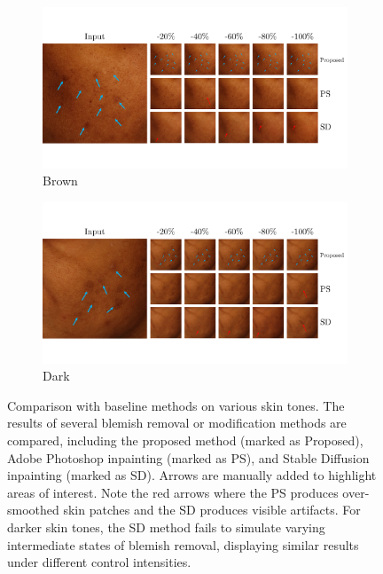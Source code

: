 \begin{spacing}{1.5}
\begin{figure}[t!]
\begin{subfigure}{\textwidth}
\begin{minipage}[c]{.85\textwidth}
        \end{minipage}
    \end{subfigure}
    \hfill
    \begin{subfigure}{\textwidth}
        \begin{minipage}[c]{.15\textwidth}
            \caption*{Brown}
        \end{minipage}%
        \begin{minipage}[c]{.85\textwidth}
            \includegraphics[width=\linewidth]{Chapter5/baseline/baseline43.pdf}
        \end{minipage}
    \end{subfigure}
    \hfill
    \begin{subfigure}{\textwidth}
        \begin{minipage}[c]{.15\textwidth}
            \caption*{Dark}
        \end{minipage}%
        \begin{minipage}[c]{.85\textwidth}
            \includegraphics[width=\linewidth]{Chapter5/baseline/baseline44.pdf}
        \end{minipage}
    \end{subfigure}
    \caption{Comparison with baseline methods on various skin tones. The results of several blemish removal or modification methods are compared, including the proposed method (marked as Proposed), Adobe Photoshop\cite{adobephotoshop} inpainting (marked as PS), and Stable Diffusion\cite{rombach2021highresolution} inpainting (marked as SD). Arrows are manually added to highlight areas of interest. Note the red arrows where the PS produces over-smoothed skin patches and the SD produces visible artifacts. For darker skin tones, the SD method fails to simulate varying intermediate states of blemish removal, displaying similar results under different control intensities.}

\end{figure}
\end{spacing}
